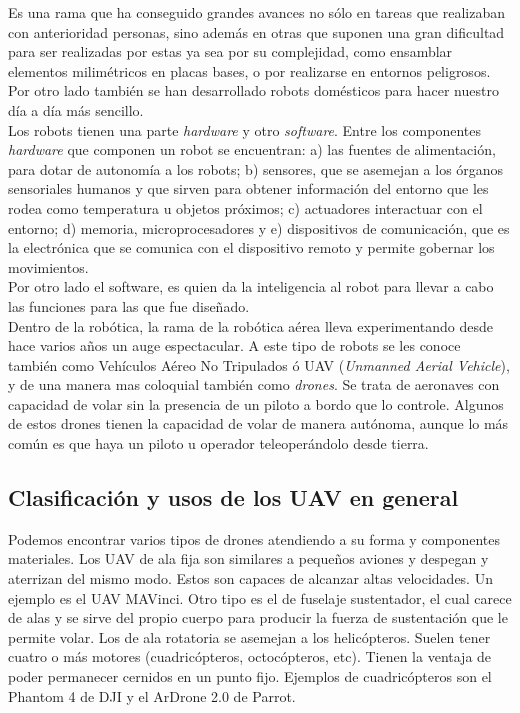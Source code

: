 Es una rama que ha conseguido grandes avances no sólo en tareas que realizaban con anterioridad personas, sino además en otras que suponen una gran dificultad para ser realizadas por estas ya sea por su complejidad, como ensamblar elementos milimétricos en placas bases, o por realizarse en entornos peligrosos. Por otro lado también se han desarrollado robots domésticos para hacer nuestro día a día más sencillo.\\

Los robots tienen una parte \emph{hardware} y otro \emph{software}. Entre los componentes \emph{hardware} que componen un robot se encuentran: a) las fuentes de alimentación, para dotar de autonomía a los robots; b) sensores, que se asemejan a los órganos sensoriales humanos y que sirven para obtener información del entorno que les rodea como temperatura u objetos próximos; c) actuadores interactuar con el entorno; d) memoria, microprocesadores y e) dispositivos de comunicación, que es la electrónica que se comunica con el dispositivo remoto y permite gobernar los movimientos.\\

Por otro lado el software, es quien da la inteligencia al robot para llevar a cabo las funciones para las que fue diseñado.\\


Dentro de la robótica, la rama de la robótica aérea lleva experimentando desde hace varios años un auge espectacular. A este tipo de robots se les conoce también como Vehículos Aéreo No Tripulados ó UAV (\emph{Unmanned Aerial Vehicle}), y de una manera mas coloquial también como \emph{drones}. Se trata de aeronaves con capacidad de volar sin la presencia de un piloto a bordo que lo controle. Algunos de estos drones tienen la capacidad de volar de manera autónoma, aunque lo más común es que haya un piloto u operador teleoperándolo desde tierra.\\

\subsection{Clasificación y usos de los UAV en general}

Podemos encontrar varios tipos de drones atendiendo a su forma y componentes materiales. Los UAV de ala fija son similares a pequeños aviones y despegan y aterrizan del mismo modo. Estos son capaces de alcanzar altas velocidades. Un ejemplo es el UAV MAVinci. Otro tipo es el de fuselaje sustentador, el cual carece de alas y se sirve del propio cuerpo para producir la fuerza de sustentación que le permite volar. Los de ala rotatoria se asemejan a los helicópteros. Suelen tener cuatro o más motores (cuadricópteros, octocópteros, etc). Tienen la ventaja de poder permanecer cernidos en un punto fijo. Ejemplos de cuadricópteros son el Phantom 4 de DJI y el ArDrone 2.0 de Parrot.\\

